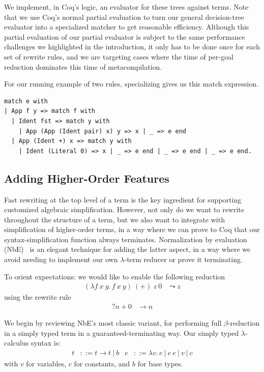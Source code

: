 \documentclass[sn-mathphys,pdflatex]{sn-jnl}%
\theoremstyle{thmstyleone}%
\theoremstyle{thmstyletwo}%
\theoremstyle{thmstylethree}%
\begin{document}
We implement, in Coq's logic, an evaluator for these trees against terms.
Note that we use Coq's normal partial evaluation to turn our general decision-tree evaluator into a specialized matcher to get reasonable efficiency.
Although this partial evaluation of our partial evaluator is subject to the same performance challenges we highlighted in the introduction, it only has to be done once for each set of rewrite rules, and we are targeting cases where the time of per-goal reduction dominates this time of metacompilation.

For our running example of two rules, specializing gives us this match expression.
\label{sec:rewrite-head:example}
\begin{verbatim}
match e with
| App f y => match f with
  | Ident fst => match y with
    | App (App (Ident pair) x) y => x | _ => e end
  | App (Ident +) x => match y with
    | Ident (Literal 0) => x | _ => e end | _ => e end | _ => e end.
\end{verbatim}

\subsection{Adding Higher-Order Features}\label{sec:thunk-eval-subst-term}

Fast rewriting at the top level of a term is the key ingredient for supporting customized algebraic simplification.
However, not only do we want to rewrite throughout the structure of a term, but we also want to integrate with simplification of higher-order terms, in a way where we can prove to Coq that our syntax-simplification function always terminates.
Normalization by evaluation (NbE)~\cite{NbE} is an elegant technique for adding the latter aspect, in a way where we avoid needing to implement our own $\lambda$-term reducer or prove it terminating.

To orient expectations: we would like to enable the following reduction
\begin{align*}
  (\lambda f\ x\ y.\, f\ x\ y)\ (+)\ z\ 0 & \leadsto z
\end{align*}
\noindent using the rewrite rule
\begin{align*}
  ?n + 0 & \to n
\end{align*}

We begin by reviewing NbE's most classic variant, for performing full $\beta$-reduction in a simply typed term in a guaranteed-terminating way.
Our simply typed $\lambda$-calculus syntax is:
\begin{align*}
  t & ::= t \to t ~|~ b
  & e & ::= \lambda v.\, e ~|~ e~e ~|~ v ~|~ c
\end{align*}
\noindent with $v$ for variables, $c$ for constants, and $b$ for base types.
\end{document}
